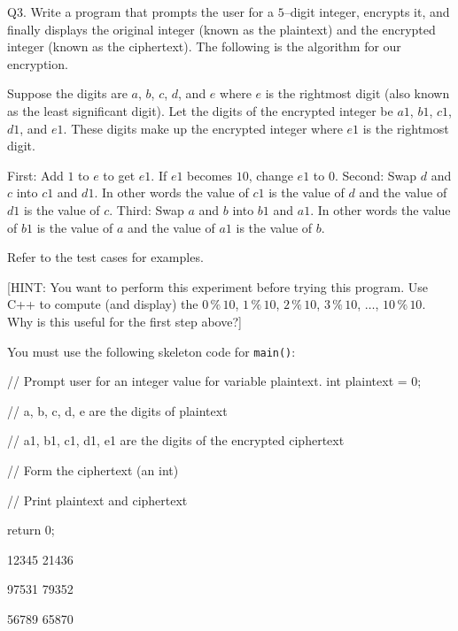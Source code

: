 Q3. Write a program that prompts the user for a $5$--digit integer, encrypts it, and finally displays the original integer (known as the plaintext) and the encrypted integer (known as the ciphertext). The following is the algorithm for our encryption. 

Suppose the digits are $a$, $b$, $c$, $d$, and $e$ where $e$ is the rightmost digit (also known as the least significant digit). Let the digits of the encrypted integer be $a1$, $b1$, $c1$, $d1$, and $e1$. These digits make up the encrypted integer where $e1$ is the rightmost digit.
\begin{tightlist}
  \li First: Add $1$ to $e$ to get $e1$. If $e1$ becomes $10$, change $e1$ to $0$.
  \li Second: Swap $d$ and $c$ into $c1$ and $d1$. In other words the value of $c1$ is the value of $d$ and the value of $d1$ is the value of $c$.
  \li Third: Swap $a$ and $b$ into $b1$ and $a1$. In other words the value of $b1$ is the value of $a$ and the value of $a1$ is the value of $b$.
\end{tightlist}

Refer to the test cases for examples.

[HINT: You want to perform this experiment before trying this program. Use C++ to compute (and display) the $0\,\%\,10$, $1\,\%\,10$,  $2\,\%\,10$,  $3\,\%\,10$, $\dots$, $10\,\%\,10$. Why is this useful for the first step above?]

You must use the following skeleton code for \verb!main()!:
\begin{console}
// Prompt user for an integer value for variable plaintext.
int plaintext = 0;

// a, b, c, d, e are the digits of plaintext

// a1, b1, c1, d1, e1 are the digits of the encrypted ciphertext

// Form the ciphertext (an int)

// Print plaintext and ciphertext

return 0;
\end{console}

\resett
\nextt
\begin{console}[commandchars=\\\{\}]
12345 21436
\end{console}

\nextt
\begin{console}[commandchars=\\\{\}]
97531 79352
\end{console}

\nextt
\begin{console}[commandchars=\\\{\}]
56789 65870
\end{console}

